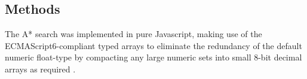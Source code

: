 \begin{methods}
\section{Methods}

The A* search was implemented in pure Javascript, making use of the ECMAScript6-compliant typed arrays to eliminate the redundancy of the default numeric float-type by compacting any large numeric sets into small 8-bit decimal arrays as required \citep{ecmascript2011}.







\end{methods}